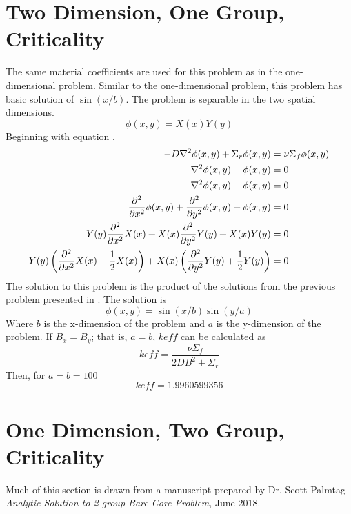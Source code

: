 \section{Two Dimension, One Group, Criticality}
  The same material coefficients are used for this problem as in the 
  one-dimensional problem. Similar to the one-dimensional problem, this 
  problem has basic solution of $\sin(x/b)$. The problem is separable in the 
  two spatial dimensions. 
  \begin{equation}
    \phi(x,y) = X(x) Y(y) 
  \end{equation}
  Beginning with equation .
  \begin{align}
    -D \mathbf{\nabla}^2 \phi(x,y) + \Sigma_r \phi(x,y) &= \nu \Sigma_f \phi(x,y) \\
    - \mathbf{\nabla}^2 \phi(x,y) - \phi(x,y) &= 0 \\
    \mathbf{\nabla}^2 \phi(x,y) + \phi(x,y) &= 0 \\
    \frac{\partial^2}{\partial x^2} \phi(x,y) + 
      \frac{\partial^2}{\partial y^2} \phi(x,y) +
      \phi(x,y) &= 0\\
    Y(y)\frac{\partial^2}{\partial x^2}X(x) +
      X(x) \frac{\partial^2}{\partial y^2} Y(y) + X(x)Y(y) &= 0\\
    Y(y)\left(\frac{\partial^2}{\partial x^2}X(x) + \frac{1}{2} X(x)\right)+
      X(x)\left(\frac{\partial^2}{\partial y^2}Y(y) + \frac{1}{2}Y(y)
      \right) &= 0
  \end{align}
  The solution to this problem is the product of the solutions from the 
  previous problem presented in . The solution is
  \begin{equation} \label{eq:twodimensionsol}
    \phi(x,y) = \sin(x/b) \sin(y/a)
  \end{equation}
  Where $b$ is the x-dimension of the problem and $a$ is the y-dimension of 
  the problem.
  If $B_x=B_y$; that is, $a=b$,  $keff$ can be calculated as
  \begin{equation}
    keff = \frac{\nu \Sigma_f}{2DB^2 + \Sigma_r} 
  \end{equation}
  Then, for $a = b = 100$
  \[ keff = 1.9960599356 \]
\section{One Dimension, Two Group, Criticality}
  Much of this section is drawn from a manuscript prepared by Dr. Scott 
  Palmtag \textit{Analytic Solution to 2-group Bare Core Problem}, June 2018.
  
